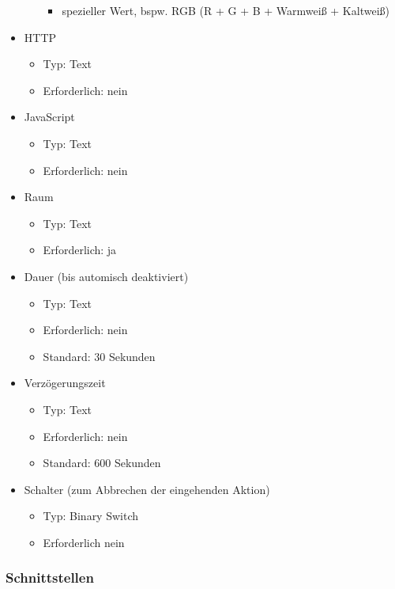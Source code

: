 \begin{itemize}
\begin{itemize}
		\begin{itemize}
			\item spezieller Wert, bspw. RGB (R + G + B + Warmweiß + Kaltweiß)
		\end{itemize}
	\end{itemize}
	\item HTTP
	\begin{itemize}
		\item Typ: Text
		\item Erforderlich: nein
	\end{itemize}
	\item JavaScript
	\begin{itemize}
		\item Typ: Text
		\item Erforderlich: nein
	\end{itemize}
	\item Raum
	\begin{itemize}
		\item Typ: Text
		\item Erforderlich: ja
	\end{itemize}
	\item Dauer (bis automisch deaktiviert)
	\begin{itemize}
		\item Typ: Text
		\item Erforderlich: nein
		\item Standard: 30 Sekunden
	\end{itemize}
	\item Verzögerungszeit
	\begin{itemize}
		\item Typ: Text
		\item Erforderlich: nein
		\item Standard: 600 Sekunden
	\end{itemize}
	\item Schalter (zum Abbrechen der eingehenden Aktion)
	\begin{itemize}
		\item Typ: Binary Switch
		\item Erforderlich nein
	\end{itemize}

\end{itemize}

\subsubsection{Schnittstellen}

